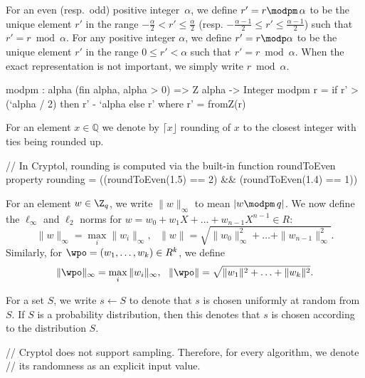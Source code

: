 For an even (resp.\ odd) positive integer~$\alpha$, 
we define $r'=r\modpm\, \alpha$ to be the unique element 
$r'$ in the range $-\frac{\alpha}{2}<r'\leq\frac{\alpha}{2}$ 
(resp. $-\frac{\alpha-1}{2}\leq r'\leq \frac{\alpha-1}{2}$) such that $r'=r\bmod \alpha$. 
For any positive integer $\alpha$, 
we define $r'=r\modp \alpha$ to be the unique element $r'$ 
in the range $0\leq r'<\alpha$ such that $r'=r\bmod \alpha$. 
When the exact representation is not important, we simply write $r\bmod \alpha$.  

\begin{code}
  modpm : {alpha} (fin alpha, alpha > 0) => Z alpha -> Integer
  modpm r = if r' > (`alpha / 2) then r' - `alpha else r'
    where r' = fromZ(r)
\end{code}

For an element $x \in \mathbb{Q}$ we denote by $\lceil x \rfloor$ 
rounding of $x$ to the closest integer with ties being rounded up.

\begin{code}
  // In Cryptol, rounding is computed via the built-in function roundToEven
  property rounding = ((roundToEven(1.5) == 2) && (roundToEven(1.4) == 1))
\end{code}

For an element $w\in\Z_q$, we write $\|w\|_\infty$ to mean $|w\modpm\, q|$.  
We now define the $\ell_\infty$ and $\ell_2$ norms for 
$w=w_0+w_1X+\ldots +w_{n-1}X^{n-1}\in R$: 
$$\|w\|_\infty=\max_{i}{\|w_i\|_\infty},\,\,\,\, \|w\|=\sqrt{\|w_0\|_\infty^2+\ldots+\|w_{n-1}\|_\infty^2}.$$   
Similarly, for $\wpo=(w_1,\ldots,w_k)\in R^k$, we define 
$$\|\wpo\|_\infty=\max_{i}{\|w_i\|_\infty},\,\,\,\, \|\wpo\|=\sqrt{\|w_1\|^2+\ldots+\|w_k\|^2}.$$

For a set $S$, we write $s\gets S$ to denote that $s$ is chosen uniformly at random from $S$.  
If $S$ is a probability distribution, then this denotes that $s$ is chosen according to the distribution $S$.  

\begin{code}
  // Cryptol does not support sampling. Therefore, for every algorithm, we denote
  // its randomness as an explicit input value.
\end{code}

